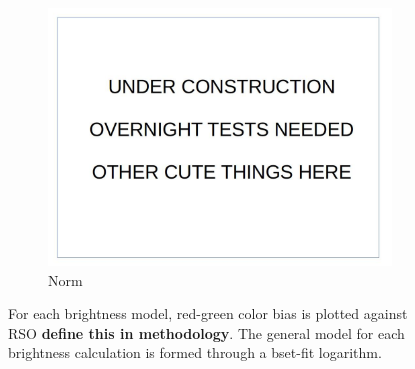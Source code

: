 \documentclass[12pt]{report}
\begin{document}
\begin{figure}
\begin{subfigure}{.49\linewidth}
  \includegraphics[width=1\linewidth]{figures/placeholder.jpg}
  \caption{Norm}
\end{subfigure}

\caption{For each brightness model, red-green color bias is plotted against RSO \textbf{define this in methodology}. The general model for each brightness calculation is formed through a bset-fit logarithm.}
\label{fig:model_scatter}
\end{figure}
\end{document}
